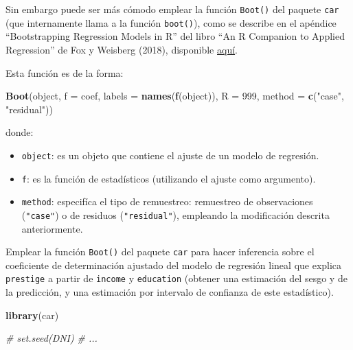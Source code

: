 \documentclass[]{book}
\newenvironment{Shaded}{\begin{snugshade}}{\end{snugshade}}
\newcommand{\KeywordTok}[1]{\textcolor[rgb]{0.13,0.29,0.53}{\textbf{#1}}}
\newcommand{\DataTypeTok}[1]{\textcolor[rgb]{0.13,0.29,0.53}{#1}}
\newcommand{\DecValTok}[1]{\textcolor[rgb]{0.00,0.00,0.81}{#1}}
\newcommand{\StringTok}[1]{\textcolor[rgb]{0.31,0.60,0.02}{#1}}
\newcommand{\CommentTok}[1]{\textcolor[rgb]{0.56,0.35,0.01}{\textit{#1}}}
\newcommand{\NormalTok}[1]{#1}
\theoremstyle{break}
\theoremstyle{definition}
\theoremstyle{definition}
\theoremstyle{definition}
\theoremstyle{remark}
\let\BeginKnitrBlock\begin \let\EndKnitrBlock\end
\begin{document}
Sin embargo puede ser más cómodo emplear la función \texttt{Boot()} del
paquete \texttt{car} (que internamente llama a la función
\texttt{boot()}), como se describe en el apéndice ``Bootstrapping
Regression Models in R'' del libro ``An R Companion to Applied
Regression'' de Fox y Weisberg (2018), disponible
\href{https://socialsciences.mcmaster.ca/jfox/Books/Companion/appendices/Appendix-Bootstrapping.pdf}{aquí}.

Esta función es de la forma:

\begin{Shaded}
\begin{Highlighting}[]
\KeywordTok{Boot}\NormalTok{(object, }\DataTypeTok{f =}\NormalTok{ coef, }\DataTypeTok{labels =} \KeywordTok{names}\NormalTok{(}\KeywordTok{f}\NormalTok{(object)), }\DataTypeTok{R =} \DecValTok{999}\NormalTok{, }
     \DataTypeTok{method =} \KeywordTok{c}\NormalTok{(}\StringTok{"case"}\NormalTok{, }\StringTok{"residual"}\NormalTok{))}
\end{Highlighting}
\end{Shaded}

donde:

\begin{itemize}
\item
  \texttt{object}: es un objeto que contiene el ajuste de un modelo de
  regresión.
\item
  \texttt{f}: es la función de estadísticos (utilizando el ajuste como
  argumento).
\item
  \texttt{method}: especifíca el tipo de remuestreo: remuestreo de
  observaciones (\texttt{"case"}) o de residuos (\texttt{"residual"}),
  empleando la modificación descrita anteriormente.
\end{itemize}

\BeginKnitrBlock{exercise}
\protect\hypertarget{exr:boot-car}{}{\label{exr:boot-car} }
\EndKnitrBlock{exercise} Emplear la función \texttt{Boot()} del paquete
\texttt{car} para hacer inferencia sobre el coeficiente de determinación
ajustado del modelo de regresión lineal que explica \texttt{prestige} a
partir de \texttt{income} y \texttt{education} (obtener una estimación
del sesgo y de la predicción, y una estimación por intervalo de
confianza de este estadístico).

\begin{Shaded}
\begin{Highlighting}[]
\KeywordTok{library}\NormalTok{(car)}

\CommentTok{# set.seed(DNI)}
\CommentTok{# ...}
\end{Highlighting}
\end{Shaded}
\end{document}
